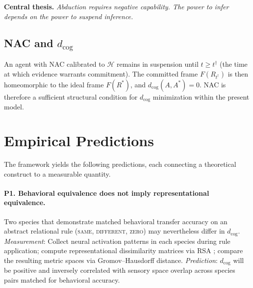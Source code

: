 \documentclass[12pt]{article}
\begin{document}
\medskip
\noindent
\textbf{Central thesis.}
\emph{Abduction requires negative capability.
The power to infer depends on the power to suspend inference.}

\subsection{NAC and $d_\mathrm{cog}$}

An agent with NAC calibrated to $\mathcal{H}$ remains in suspension
until $t \geq t^\dagger$ (the time at which evidence warrants
commitment).
The committed frame $F(R_{t^\dagger})$ is then homeomorphic to the
ideal frame $F(R^*)$, and $d_\mathrm{cog}(A, A^*) = 0$.
NAC is therefore a sufficient structural condition for $d_\mathrm{cog}$
minimization within the present model.

\section{Empirical Predictions}

The framework yields the following predictions, each connecting a
theoretical construct to a measurable quantity.

\paragraph{P1. Behavioral equivalence does not imply representational equivalence.}
Two species that demonstrate matched behavioral transfer accuracy on
an abstract relational rule (\textsc{same}, \textsc{different},
\textsc{zero}) may nevertheless differ in $d_\mathrm{cog}$.
\emph{Measurement}: Collect neural activation patterns in each species
during rule application; compute representational dissimilarity matrices
via RSA \cite{kriegeskorte2008}; compare the resulting metric spaces
via Gromov--Hausdorff distance.
\emph{Prediction}: $d_\mathrm{cog}$ will be positive and inversely
correlated with sensory space overlap across species pairs matched for
behavioral accuracy.
\end{document}
